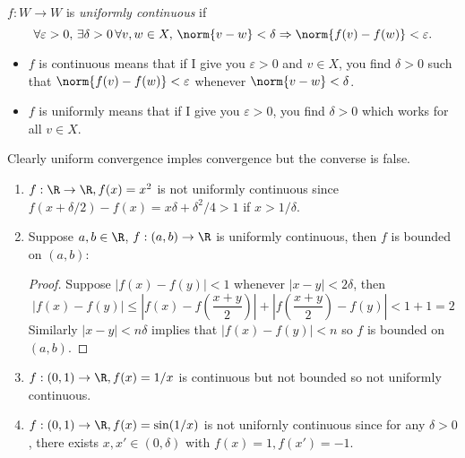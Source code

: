 \documentclass[a4paper]{article}
\theoremstyle{definition}
\begin{document}
\begin{definition}
  \(f: W \to W\) is \emph{uniformly continuous} if
  \[
    \forall \varepsilon>0, \, \exists \delta>0 \, \forall v, w \in X, \, \norm{v - w} < \delta \Rightarrow \norm{f(v) - f(w)} < \varepsilon.
  \]
\end{definition}

\begin{note}\leavevmode
  \begin{itemize}
  \item \(f\) is continuous means that if I give you \(\varepsilon > 0\) and \(v \in X\), you find \(\delta > 0\) such that \(\norm{f(v) - f(w)} < \varepsilon\) whenever \(\norm{v - w} < \delta\).
  \item \(f\) is uniformly means that if I give you \(\varepsilon > 0\), you find \(\delta > 0\) which works for all \(v \in X\).
  \end{itemize}
\end{note}

Clearly uniform convergence imples convergence but the converse is false.

\begin{eg}\leavevmode
  \begin{enumerate}
  \item \(f: \R \to \R, f(x) = x^2\) is not uniformly continuous since \(f(x + \delta/2) - f(x) = x \delta + \delta^2/4 > 1\) if \(x > 1/\delta\).
  \item Suppose \(a, b \in \R\), \(f: (a, b) \to \R\) is uniformly continuous, then \(f\) is bounded on \((a, b)\):
    \begin{proof}
      Suppose \(|f(x) - f(y)| < 1\) whenever \(|x - y| < 2 \delta\), then
      \[
        |f(x) - f(y)| \leq \left| f(x) - f(\frac{x+y}{2}) \right| + \left| f(\frac{x+y}{2}) - f(y) \right| < 1 + 1 = 2
      \]
      Similarly \(|x - y| < n \delta\) implies that \(|f(x) - f(y)| < n\) so \(f\) is bounded on \((a, b)\).
    \end{proof}
    \item \(f:(0, 1) \to \R, f(x) = 1/x\) is continuous but not bounded so not uniformly continuous.
    \item \(f:(0, 1) \to \R, f(x) = \sin(1/x)\) is not unifornly continuous since for any \(\delta > 0\), there exists \(x, x' \in(0, \delta)\) with \(f(x) = 1, f(x') = -1\).
  \end{enumerate}
\end{eg}
\end{document}
